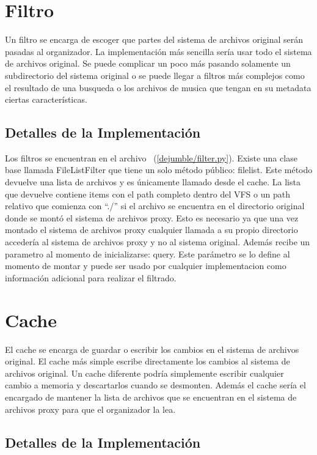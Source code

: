 \section{Filtro}

Un filtro se encarga de escoger que partes del sistema de archivos original serán pasadas al organizador. La implementación más sencilla sería usar todo el sistema de archivos original. Se puede complicar un poco más pasando solamente un subdirectorio del sistema original o se puede llegar a filtros más complejos como el resultado de una busqueda o los archivos de musica que tengan en su metadata ciertas características.

\subsection{Detalles de la Implementación}

Los filtros se encuentran en el archivo ~(\ref{dejumble/filter.py}). Existe una clase base llamada FileListFilter que tiene un solo método público: filelist. Este método devuelve una lista de archivos y es únicamente llamado desde el cache. La lista que devuelve contiene items con el path completo dentro del VFS o un path relativo que comienza con ``./'' si el archivo se encuentra en el directorio original donde se montó el sistema de archivos proxy. Esto es necesario ya que una vez montado el sistema de archivos proxy cualquier llamada a su propio directorio accedería al sistema de archivos proxy y no al sistema original. Además recibe un parametro al momento de inicializarse: query. Este parámetro se lo define al momento de montar y puede ser usado por cualquier implementacion como información adicional para realizar el filtrado.


\section{Cache}

El cache se encarga de guardar o escribir los cambios en el sistema de archivos original. El cache más simple escribe directamente los cambios al sistema de archivos original. Un cache diferente podría simplemente escribir cualquier cambio a memoria y descartarlos cuando se desmonten. Además el cache sería el encargado de mantener la lista de archivos que se encuentran en el sistema de archivos proxy para que el organizador la lea.

\subsection{Detalles de la Implementación}

